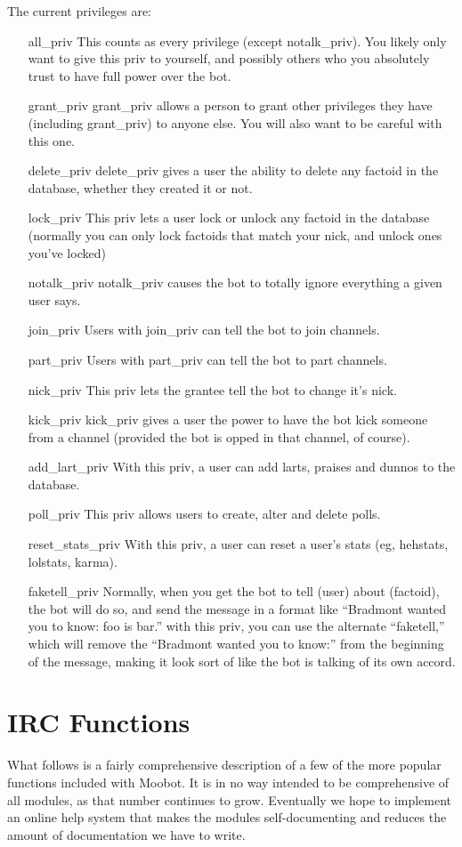 \documentclass[titlepage]{article}
\begin{document}
		The current privileges are:
		\begin{itemize}
			\item[all\_priv]  This counts as every privilege (except notalk\_priv).  You likely only want to give this priv to yourself, and possibly others who you absolutely trust to have full power over the bot.
			\item[grant\_priv]  grant\_priv allows a person to grant other privileges they have (including grant\_priv) to anyone else.  You will also want to be careful with this one.
			\item[delete\_priv]  delete\_priv gives a user the ability to delete any factoid in the database, whether they created it or not.
			\item[lock\_priv] This priv lets a user lock or unlock any factoid in the database (normally you can only lock factoids that match your nick, and unlock ones you've locked)
			\item[notalk\_priv] notalk\_priv causes the bot to totally ignore everything a given user says.
			\item[join\_priv]  Users with join\_priv can tell the bot to join channels.
			\item[part\_priv]  Users with part\_priv can tell the bot to part channels.
			\item[nick\_priv]  This priv lets the grantee tell the bot to change it's nick.
			\item[kick\_priv]  kick\_priv gives a user the power to have the bot kick someone from a channel (provided the bot is opped in that channel, of course).
			\item[add\_lart\_priv] With this priv, a user can add larts, praises and dunnos to the database.
			\item[poll\_priv]  This priv allows users to create, alter and delete polls.
			\item[reset\_stats\_priv]  With this priv, a user can reset a user's stats (eg, hehstats, lolstats, karma).
			\item[faketell\_priv] Normally, when you get the bot to tell (user) about (factoid), the bot will do so, and send the message in a format like ``Bradmont wanted you to know:  foo is bar.''  with this priv, you can use the alternate ``faketell,'' which will remove the ``Bradmont wanted you to know:'' from the beginning of the message, making it look sort of like the bot is talking of its own accord.
		\end{itemize}

	\section{IRC Functions}
		What follows is a fairly comprehensive description of a few of the
		more popular functions included with Moobot.  It is in no way intended
		to be comprehensive of all modules, as that number continues to grow.
		Eventually we hope to implement an online help system that makes the
		modules self-documenting and reduces the amount of documentation we
		have to write.
	
\end{document}
